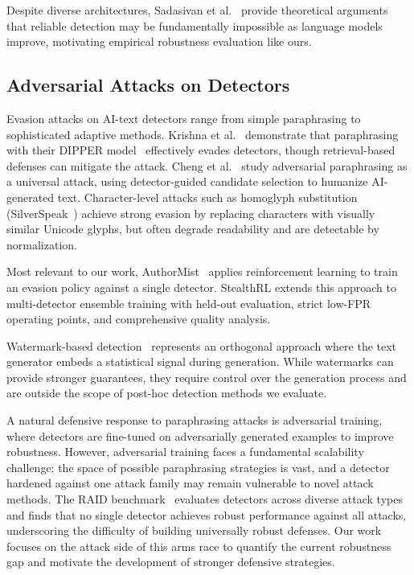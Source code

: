 \documentclass[11pt]{article}
\begin{document}
Despite diverse architectures, Sadasivan et al.~\cite{sadasivan2023aigenerated} provide theoretical arguments that reliable detection may be fundamentally impossible as language models improve, motivating empirical robustness evaluation like ours.

\subsection{Adversarial Attacks on Detectors}

Evasion attacks on AI-text detectors range from simple paraphrasing to sophisticated adaptive methods. Krishna et al.~\cite{krishna2023paraphrasing} demonstrate that paraphrasing with their DIPPER model~\cite{krishna2023dipper} effectively evades detectors, though retrieval-based defenses can mitigate the attack. Cheng et al.~\cite{cheng2025adversarialparaphrasinguniversalattack} study adversarial paraphrasing as a universal attack, using detector-guided candidate selection to humanize AI-generated text. Character-level attacks such as homoglyph substitution (SilverSpeak~\cite{creo2025silverspeakevadingaigeneratedtext}) achieve strong evasion by replacing characters with visually similar Unicode glyphs, but often degrade readability and are detectable by normalization.

Most relevant to our work, AuthorMist~\cite{david2025authormistevadingaitext} applies reinforcement learning to train an evasion policy against a single detector. StealthRL extends this approach to multi-detector ensemble training with held-out evaluation, strict low-FPR operating points, and comprehensive quality analysis.

Watermark-based detection~\cite{kirchenbauer2023watermark} represents an orthogonal approach where the text generator embeds a statistical signal during generation. While watermarks can provide stronger guarantees, they require control over the generation process and are outside the scope of post-hoc detection methods we evaluate.

A natural defensive response to paraphrasing attacks is adversarial training, where detectors are fine-tuned on adversarially generated examples to improve robustness. However, adversarial training faces a fundamental scalability challenge: the space of possible paraphrasing strategies is vast, and a detector hardened against one attack family may remain vulnerable to novel attack methods. The RAID benchmark~\cite{dugan2024raidsharedbenchmarkrobust} evaluates detectors across diverse attack types and finds that no single detector achieves robust performance against all attacks, underscoring the difficulty of building universally robust defenses. Our work focuses on the attack side of this arms race to quantify the current robustness gap and motivate the development of stronger defensive strategies.
\end{document}
